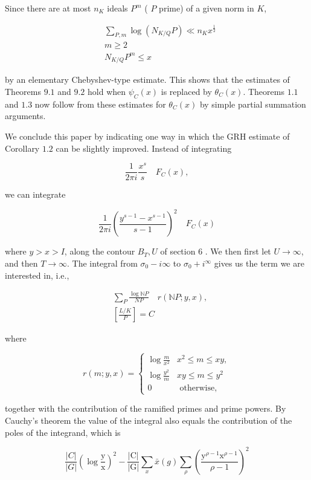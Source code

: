 Since there are at most $n_{K}$ ideals $P^{m}$ ( $P$ prime) of a given norm in $K$, 

$$
\begin{aligned}
& \sum_{P, m} \log \left(N_{K / Q} P\right) \ll n_{K} x^{\frac{1}{2}} \\
& m \geqslant 2 \\
& N_{K / Q} P^{m} \leqslant x
\end{aligned}
$$

by an elementary Chebyshev-type estimate. This shows that the estimates of Theorems $9.1$ and $9.2$ hold when $\psi_{C}(x)$ is replaced by $\theta_{C}(x)$. Theorems $1.1$ and $1.3$ now follow from these estimates for $\theta_{C}(x)$ by simple partial summation arguments.

We conclude this paper by indicating one way in which the GRH estimate of Corollary $1.2$ can be slightly improved. Instead of integrating

$$
\frac{1}{2 \pi i} \frac{x^{s}}{s} \quad F_{C}(x),
$$

we can integrate

$$
\frac{1}{2 \pi i}\left(\frac{y^{s-1}-x^{s-1}}{s-1}\right)^{2} \quad F_{C}(x)
$$

where $y>x>I$, along the contour $B_{T}, U$ of section 6 . We then first let $U \rightarrow \infty$, and then $T \rightarrow \infty$. The integral from $\sigma_{0}-i \infty$ to $\sigma_{0}+i^{\infty}$ gives us the term we are interested in, i.e.,

$$
\begin{aligned}
&\sum_{P} \frac{\log \mathbb{N} P}{N P} \quad r(\mathbb{N} P ; y, x), \\
&{\left[\frac{L / K}{P}\right]=C}
\end{aligned}
$$

where

$$
r(m ; y, x)=\left\{\begin{array}{cl}
\log \frac{m}{x^{2}} & x^{2} \leqslant m \leqslant x y, \\
\log \frac{y^{2}}{m} & x y \leqslant m \leqslant y^{2} \\
0 & \text { otherwise, }
\end{array}\right.
$$

together with the contribution of the ramified primes and prime powers. By Cauchy's theorem the value of the integral also equals the contribution of the poles of the integrand, which is

$$
\frac{|C|}{|G|}\left(\log \frac{\mathrm{y}}{\mathrm{x}}\right)^{2}-\frac{|\mathrm{C}|}{|\mathrm{G}|} \sum_{x} \bar{x}(g) \sum_{\rho}\left(\frac{\mathrm{y}^{\rho-1} \mathrm{x}^{\rho-1}}{\rho-1}\right)^{2}
$$

